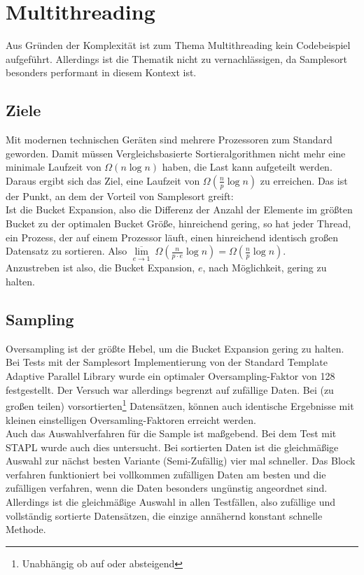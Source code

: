 \section{Multithreading}\label{sec:multithreading}
	Aus Gründen der Komplexität ist zum Thema Multithreading kein Codebeispiel aufgeführt.
	Allerdings ist die Thematik nicht zu vernachlässigen, da Samplesort besonders performant in diesem Kontext ist.
	
	\subsection{Ziele}
		Mit modernen technischen Geräten sind mehrere Prozessoren zum Standard geworden.
		Damit müssen Vergleichsbasierte Sortieralgorithmen nicht mehr eine minimale Laufzeit von $\Omega(n\log{n})$ haben, die Last kann aufgeteilt werden.
		Daraus ergibt sich das Ziel, eine Laufzeit von $\Omega\left(\frac{n}{p}\log{n}\right)$ zu erreichen.
		Das ist der Punkt, an dem der Vorteil von Samplesort greift:\\
		Ist die Bucket Expansion, also die Differenz der Anzahl der Elemente im größten Bucket zu der optimalen Bucket Größe, hinreichend gering, so hat jeder Thread, ein Prozess, der auf einem Prozessor läuft, einen hinreichend identisch großen Datensatz zu sortieren.
		Also $\underset{e\to 1}{\overline\lim}\ \Omega\left(\frac{n}{p\cdot e}\log{n}\right)=\Omega\left(\frac{n}{p}\log{n}\right)$.\\
		Anzustreben ist also, die Bucket Expansion, $e$, nach Möglichkeit, gering zu halten.
		
	\subsection{Sampling}
		Oversampling ist der größte Hebel, um die Bucket Expansion gering zu halten.
		Bei Tests mit der Samplesort Implementierung von der Standard Template Adaptive Parallel Library \autocite{berlin-2007} wurde ein optimaler Oversampling-Faktor von 128 festgestellt.
		Der Versuch war allerdings begrenzt auf zufällige Daten.
		Bei (zu großen teilen) vorsortierten\footnote{Unabhängig ob auf oder absteigend} Datensätzen, können auch identische Ergebnisse mit kleinen einstelligen Oversamling-Faktoren erreicht werden.\\
		Auch das Auswahlverfahren für die Sample ist maßgebend.
		Bei dem Test mit STAPL wurde auch dies untersucht.
		Bei sortierten Daten ist die gleichmäßige Auswahl zur nächst besten Variante (Semi-Zufällig) vier mal schneller.
		Das Block verfahren funktioniert bei vollkommen zufälligen Daten am besten und die zufälligen verfahren, wenn die Daten besonders ungünstig angeordnet sind.
		Allerdings ist die gleichmäßige Auswahl in allen Testfällen, also zufällige und vollständig sortierte Datensätzen, die einzige annähernd konstant schnelle Methode.
		
